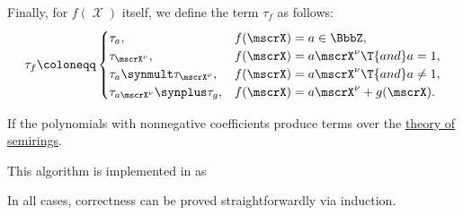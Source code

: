 \begin{algorithm}
\begin{thmenum}
     Finally, for \( f(\mscrX) \) itself, we define the term \( \tau_f \) as follows:
    \begin{equation}\label{eq:alg:logical_term_to_integer_polynomial/polynomial}
      \tau_f \coloneqq \begin{cases}
        \tau_a,                              &f(\mscrX) = a \in \BbbZ, \\
        \tau_{\mscrX^\nu},                   &f(\mscrX) = a \mscrX^\nu \T{and} a = 1, \\
        \tau_a \synmult \tau_{\mscrX^\nu},   &f(\mscrX) = a \mscrX^\nu \T{and} a \neq 1, \\
        \tau_{a \mscrX^\nu} \synplus \tau_g, &f(\mscrX) = a \mscrX^\nu + g(\mscrX).
      \end{cases}
    \end{equation}
  \end{thmenum}
\end{algorithm}
\begin{comments}
  \item If the polynomials with nonnegative coefficients produce terms over the \hyperref[def:semiring/theory]{theory of semirings}.
  \item This algorithm is implemented in \cite{notebook:code} as
  \begin{CodeRefDisplay}
  \end{CodeRefDisplay}
\end{comments}
\begin{defproof}
  In all cases, correctness can be proved straightforwardly via induction.
\end{defproof}

